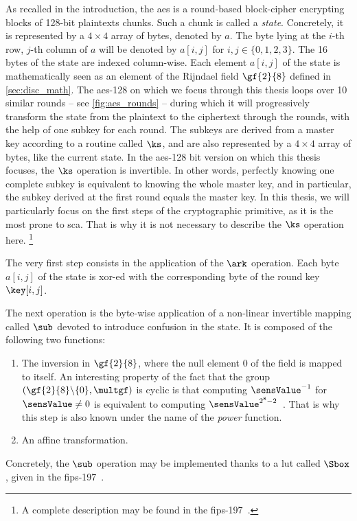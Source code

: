 \label{sec:desc_aes}
As recalled in the introduction, the \gls{aes} is a round-based block-cipher encrypting blocks of 128-bit plaintexts chunks.
Such a chunk is called a \emph{state}.
Concretely, it is represented by a \(4 \times 4\) array of bytes, denoted by \(a\).
The byte lying at the \(i\)-th row, \(j\)-th column of \(a\) will be denoted by \(a[i,j]\) for \(i,j \in \{0,1,2,3\}\).
The 16 bytes of the state are indexed column-wise.
Each element \(a[i,j]\) of the state is mathematically seen as an element of the Rijndael field \(\gf{2}{8}\) defined in \autoref{sec:disc_math}.
The \gls{aes}-128 on which we focus through this thesis loops over 10 similar rounds -- see \autoref{fig:aes_rounds} -- during which it will progressively transform the state from the plaintext to the ciphertext through the rounds, with the help of one subkey for each round.
The subkeys are derived from a master key according to a routine called \(\ks\), and are also represented by a \(4 \times 4\) array of bytes, like the current state.
In the \gls{aes}-128 bit version on which this thesis focuses, the \(\ks\) operation is invertible.
In other words, perfectly knowing one complete subkey is equivalent to knowing the whole master key, and in particular, the subkey derived at the first round equals the master key.
In this thesis, we will particularly focus on the first steps of the cryptographic primitive, as it is the most prone to \gls{sca}.
That is why it is not necessary to describe the \(\ks\) operation here.%
\footnote{A complete description may be found in the \gls{fips}-197~\cite{nist_2001}.}

The very first step consists in the application of the \(\ark\) operation.
Each byte \(a[i,j]\) of the state is xor-ed with the corresponding byte of the round key \(\key[i,j]\).

The next operation is the byte-wise application of a non-linear invertible mapping  called \(\sub\) devoted to introduce \gls{confusion} in the state.
It is composed of the following two functions:
\begin{enumerate}
	\item The inversion in \(\gf{2}{8}\), where the null element \(0\) of the field is mapped to itself.
	An interesting property of the fact that the group \((\gf{2}{8}\backslash\{0\}, \multgf)\) is \gls{cyclic} is that computing \(\sensValue^{-1}\) for \(\sensValue \neq 0\) is equivalent to computing \(\sensValue^{2^8-2}\)~\cite[Lem.5.3.4]{terras_2018}.
	That is why this step is also known under the name of the \emph{power} function.
	\item An affine transformation.
\end{enumerate}
Concretely, the \(\sub\) operation may be implemented thanks to a \gls{lut} called \(\Sbox\), given in the \gls{fips}-197~\cite{nist_2001}.

